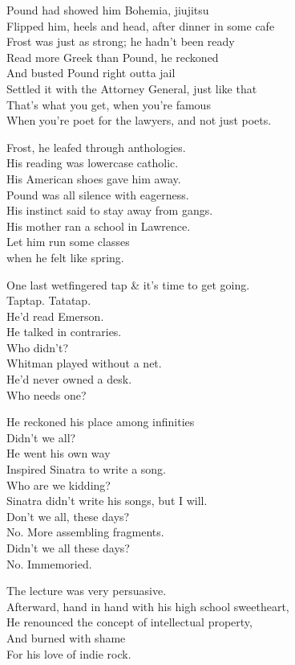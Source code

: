 Pound had showed him Bohemia, jiujitsu \\
Flipped him, heels and head, after dinner in some cafe \\
Frost was just as strong; he hadn't been ready \\
Read more Greek than Pound, he reckoned \\
And busted Pound right outta jail \\
Settled it with the Attorney General, just like that \\
That's what you get, when you're famous \\
When you're poet for the lawyers, and not just poets.

Frost, he leafed through anthologies. \\
His reading was lowercase catholic. \\
His American shoes gave him away. \\
Pound was all silence with eagerness. \\
His instinct said to stay away from gangs. \\
His mother ran a school in Lawrence. \\
Let him run some classes \\
\qquad when he felt like spring.

One last wetfingered tap \& it's time to get going. \\
Taptap. Tatatap. \\
He'd read Emerson. \\
He talked in contraries. \\
Who didn't? \\
Whitman played without a net. \\
He'd never owned a desk. \\
Who needs one?

He reckoned his place among infinities \\
Didn't we all? \\
He went his own way \\
Inspired Sinatra to write a song. \\
Who are we kidding? \\
Sinatra didn't write his songs, but I will. \\
Don't we all, these days? \\
No. More assembling fragments. \\
Didn't we all these days? \\
No. Immemoried.

The lecture was very persuasive. \\
Afterward, hand in hand with his high school sweetheart, \\
He renounced the concept of intellectual property, \\
And burned with shame \\
For his love of indie rock.